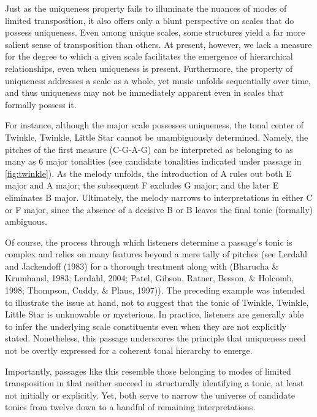 \documentclass[10pt,twocolumn]{article}
\numberwithin{equation}{section} %
\begin{document}
Just as the
uniqueness property fails to illuminate the nuances of modes of limited
transposition, it also offers only a blunt perspective on scales that do
possess uniqueness. Even among unique scales, some structures yield a far more
salient sense of transposition than others. At present, however, we lack a
measure for the degree to which a given scale facilitates the emergence of
hierarchical relationships, even when uniqueness is present. Furthermore, the
property of uniqueness addresses a scale as a whole, yet music unfolds
sequentially over time, and thus uniqueness may not be immediately apparent
even in scales that formally possess it.

For instance, although
the major scale possesses uniqueness, the tonal center of Twinkle, Twinkle,
Little Star cannot be unambiguously determined. Namely, the pitches of the
first measure (C-G-A-G) can be interpreted as belonging to as many as 6 major
tonalities (see candidate tonalities indicated under passage in \autoref{fig:twinkle}). As the melody unfolds, the introduction
of A\text{$\natural$} rules out both E\text{$\flat$} major and A\text{$\flat$} major; the subsequent F\text{$\natural$} excludes G major; and the later E\text{$\natural$} eliminates B\text{$\flat$} major. Ultimately, the melody narrows
to interpretations in either C or F major, since the absence of a decisive B\text{$\natural$} or B\text{$\flat$} leaves the final tonic (formally)
ambiguous.

Of course, the
process through which listeners determine a passage's tonic is complex and
relies on many features beyond a mere tally of pitches (see Lerdahl
and Jackendoff (1983) for a thorough treatment along with (Bharucha \& Krumhansl, 1983; Lerdahl, 2004; Patel, Gibson, Ratner, Besson, \&
Holcomb, 1998; Thompson, Cuddy, \& Plaus, 1997)). The preceding example was intended to
illustrate the issue at hand, not to suggest that the tonic of Twinkle,
Twinkle, Little Star is unknowable or mysterious. In practice, listeners are
generally able to infer the underlying scale constituents even when they are
not explicitly stated. Nonetheless, this passage underscores the principle that
uniqueness need not be overtly expressed for a coherent tonal hierarchy to
emerge.

Importantly,
passages like this resemble those belonging to modes of limited transposition
in that neither succeed in structurally identifying a tonic, at least not
initially or explicitly. Yet, both serve to narrow the universe of candidate
tonics from twelve down to a handful of remaining interpretations.
\end{document}
